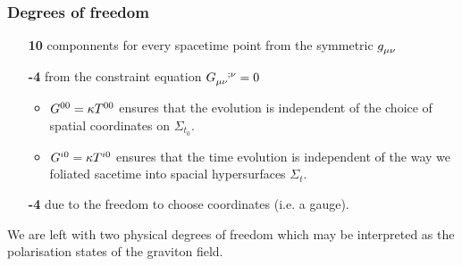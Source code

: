 \subsubsection{Degrees of freedom}
\begin{itemize}
  \item[\color{section_color}\textsf{\textbf{10}}]
  componnents for every spacetime point from the symmetric $\tensor{g}{_\mu_\nu}$
  \item[\color{section_color}\textsf{\textbf{-4}}] from the
  constraint equation $\tensor{G}{_\mu_\nu^{;\nu}}=0$
  \begin{itemize}
    \item
    $\tensor{G}{^0^0}=\kappa \tensor{T}{^0^0}$ ensures that the
    evolution is independent of the choice of spatial coordinates on
    $\Sigma_{t_0}$.
    \item
    $\tensor{G}{^i^0}=\kappa \tensor{T}{^i^0}$ ensures that the time
    evolution is independent of the way we foliated sacetime into spacial
    hypersurfaces $\Sigma_{t}.    $
  \end{itemize}
  \item[\color{section_color}\textsf{\textbf{-4}}] due to the freedom
  to choose coordinates (i.e. a gauge).
\end{itemize}
We are left with two physical degrees of freedom which may be interpreted as the
polarisation states of the graviton field.
